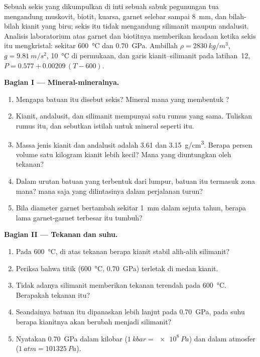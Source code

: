 \begin{problem}
\label{pb:g12:metamorphic-rocks:1}
Sebuah sekis yang dikumpulkan di inti sebuah sabuk pegunungan tua mengandung
muskovit, biotit, kuarsa, garnet selebar sampai \qty{8}{mm}, dan bilah-bilah
kianit yang biru; sekis itu tidak mengandung silimanit maupun andalusit.
Analisis laboratorium atas garnet dan biotitnya memberikan keadaan ketika sekis
itu mengkristal: sekitar \qty{600}{\celsius} dan \qty{0.70}{GPa}. Ambillah $\rho =
\qty{2830}{kg/m^3}$, $g = \qty{9.81}{m/s^2}$, \qty{10}{\celsius} di
permukaan, dan garis kianit--silimanit pada latihan~12, $P = 0.577 +
0.00209\,(T - 600)$.

\medskip
\noindent\textbf{Bagian I --- Mineral-mineralnya.}
\begin{enumerate}
  \item Mengapa batuan itu disebut sekis? Mineral mana yang membentuk
        ?
  \item Kianit, andalusit, dan silimanit mempunyai satu rumus yang sama.
        Tuliskan rumus itu, dan sebutkan istilah untuk mineral seperti itu.
  \item Massa jenis kianit dan andalusit adalah \num{3.61} dan
        \qty{3.15}{g/cm^3}. Berapa persen volume satu kilogram kianit lebih
        kecil? Mana yang diuntungkan oleh tekanan?
  \item Dalam urutan  batuan yang terbentuk dari lumpur, batuan
        itu termasuk zona mana?  mana saja yang dilintasinya dalam
        perjalanan turun?
  \item Bila diameter garnet bertambah sekitar \qty{1}{mm} dalam sejuta
        tahun, berapa lama garnet-garnet terbesar itu tumbuh?
\end{enumerate}

\medskip
\noindent\textbf{Bagian II --- Tekanan dan suhu.}
\begin{enumerate}[resume]
  \item Pada \qty{600}{\celsius}, di atas tekanan berapa kianit stabil alih-alih
        silimanit?
  \item Periksa bahwa titik (\qty{600}{\celsius}, \qty{0.70}{GPa}) terletak di
        medan kianit.
  \item Tidak adanya silimanit memberikan tekanan terendah pada
        \qty{600}{\celsius}. Berapakah tekanan itu?
  \item Seandainya batuan itu dipanaskan lebih lanjut pada \qty{0.70}{GPa}, pada
        suhu berapa kianitnya akan berubah menjadi silimanit?
  \item Nyatakan \qty{0.70}{GPa} dalam kilobar ($\qty{1}{kbar} =
        \qty{e8}{Pa}$) dan dalam atmosfer ($\qty{1}{atm} = \qty{101325}{Pa}$).
\end{enumerate}


\end{problem}
